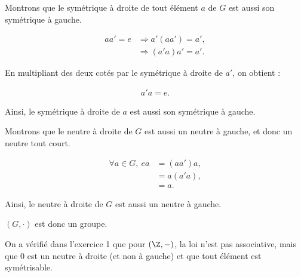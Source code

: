 Montrons que le symétrique à droite de tout élément $a$ de $G$ est aussi son symétrique à gauche.

\begin{align*}
    aa' = e &\Rightarrow a'(aa') = a', \\
    &\Rightarrow (a'a)a' = a'. 
\end{align*}

En multipliant des deux cotés par le symétrique à droite de $a'$, on obtient :

\begin{align*}
    a'a = e.
\end{align*}

Ainsi, le symétrique à droite de $a$ est aussi son symétrique à gauche.

Montrons que le neutre à droite de $G$ est aussi un neutre à gauche, et donc un neutre tout court.

\begin{align*}
    \forall a \in G,\ ea &= (aa')a, \\
    &= a(a'a), \\
    &= a.
\end{align*}

Ainsi, le neutre à droite de $G$ est aussi un neutre à gauche.

$(G, \cdot)$ est donc un groupe.

On a vérifié dans l'exercice 1 que pour $(\Z, -)$, la loi n'est pas associative, mais que 0 est un neutre à droite (et non à gauche) et que tout élément est symétrisable.